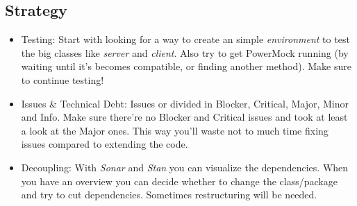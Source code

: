 \documentclass{article}
\begin{document}
\subsection*{Strategy}
\begin{itemize}
	\item Testing: Start with looking for a way to create an simple \emph{environment} to test the big classes like \emph{server} and \emph{client}. Also try to get PowerMock running (by waiting until it's becomes compatible, or finding another method). Make sure to continue testing! 
	\item Issues \& Technical Debt: Issues or divided in Blocker, Critical, Major, Minor and Info. Make sure there're no Blocker and Critical issues and took at least a look at the Major ones. This way you'll waste not to much time fixing issues compared to extending the code.  
	\item Decoupling: With \emph{Sonar} and \emph{Stan} you can visualize the dependencies. When you have an overview you can decide whether to change the class/package and try to cut dependencies. Sometimes restructuring will be needed. 
\end{itemize}
\end{document}
